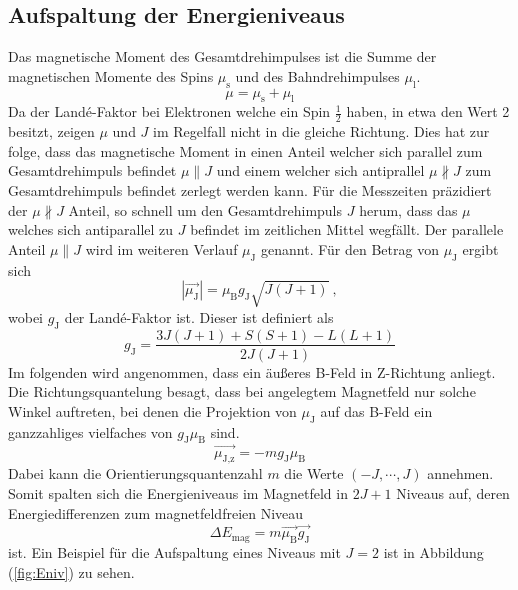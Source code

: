 \subsection{Aufspaltung der Energieniveaus}
Das magnetische Moment des Gesamtdrehimpulses ist die Summe der magnetischen Momente des Spins $\mu_\text{s}$ und des Bahndrehimpulses $\mu_\text{l}$.
\begin{equation}
  \mu = \mu_\text{s} + \mu_\text{l}
\end{equation}
Da der Landé-Faktor bei Elektronen welche ein Spin $\frac{1}{2}$ haben, in etwa den Wert 2 besitzt, zeigen $\mu$ und $J$ im Regelfall nicht in die gleiche Richtung. Dies hat zur folge, dass das magnetische Moment in einen Anteil welcher sich parallel zum Gesamtdrehimpuls befindet $\mu \parallel J$ und einem welcher sich antiprallel $\mu \nparallel J$ zum Gesamtdrehimpuls befindet zerlegt werden kann. Für die Messzeiten präzidiert der  $\mu \nparallel J$ Anteil, so schnell um den Gesamtdrehimpuls $J$ herum, dass das $\mu$ welches sich antiparallel zu $J$ befindet im zeitlichen Mittel wegfällt. Der parallele Anteil $\mu \parallel J$ wird im weiteren Verlauf $\mu_\text{J}$ genannt. Für den Betrag von $\mu_\text{J}$ ergibt sich
\begin{equation}
  |\vec{\mu_\text{J}}| = \mu_\text{B} g_\text{J} \sqrt{J(J+1)} \ ,
  \label{eqn:muJ}
\end{equation}
wobei $g_\text{J}$ der Landé-Faktor ist. Dieser ist definiert als
\begin{equation}
  g_\text{J} = \frac{3J(J+1) + S(S+1) -L(L+1)}{2J(J+1)}
  \label{eqn:Lan}
\end{equation}
Im folgenden wird angenommen, dass ein äußeres B-Feld in Z-Richtung anliegt. Die Richtungsquantelung besagt, dass bei angelegtem Magnetfeld nur solche Winkel auftreten, bei denen die Projektion von $\mu_\text{J}$ auf das B-Feld ein ganzzahliges vielfaches von $g_\text{J} \mu_\text{B}$ sind.
\begin{equation}
  \vec{\mu_\text{J,z}} = -m g_\text{J} \mu_\text{B}
  \label{eqn:mu}
\end{equation}
Dabei kann die Orientierungsquantenzahl $m$ die Werte $(-J, \cdots, J)$ annehmen. Somit spalten sich die Energieniveaus im Magnetfeld in $2J+1$ Niveaus auf, deren Energiedifferenzen zum magnetfeldfreien Niveau
\begin{equation}
	\Delta E_\text{mag} = m \vec{\mu_\text{B}} \vec{g_\text{J}}
  \label{eqn:delE}
\end{equation}
ist. Ein Beispiel für die Aufspaltung eines Niveaus mit $J=2$ ist in Abbildung (\ref{fig:Eniv}) zu sehen.
